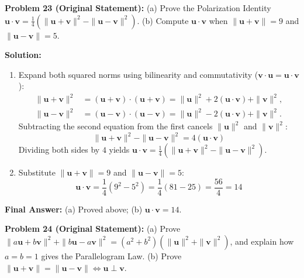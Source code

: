 \documentclass[11pt, letterpaper]{article}
\theoremstyle{definition}
\theoremstyle{remark}
\begin{document}
\textbf{Problem 23 (Original Statement):} (a) Prove the Polarization Identity $\mathbf{u} \cdot \mathbf{v} = \frac{1}{4}\left(\|\mathbf{u} + \mathbf{v}\|^2 - \|\mathbf{u} - \mathbf{v}\|^2\right)$. (b) Compute $\mathbf{u} \cdot \mathbf{v}$ when $\|\mathbf{u} + \mathbf{v}\| = 9$ and $\|\mathbf{u} - \mathbf{v}\| = 5$.

\textbf{Solution:}
\begin{enumerate}[label=(\alph*)]
    \item Expand both squared norms using bilinearity and commutativity ($\mathbf{v} \cdot \mathbf{u} = \mathbf{u} \cdot \mathbf{v}$):
    \begin{align*}
    \|\mathbf{u} + \mathbf{v}\|^2 &= (\mathbf{u} + \mathbf{v}) \cdot (\mathbf{u} + \mathbf{v}) = \|\mathbf{u}\|^2 + 2(\mathbf{u} \cdot \mathbf{v}) + \|\mathbf{v}\|^2, \\
    \|\mathbf{u} - \mathbf{v}\|^2 &= (\mathbf{u} - \mathbf{v}) \cdot (\mathbf{u} - \mathbf{v}) = \|\mathbf{u}\|^2 - 2(\mathbf{u} \cdot \mathbf{v}) + \|\mathbf{v}\|^2.
    \end{align*}
    Subtracting the second equation from the first cancels $\|\mathbf{u}\|^2$ and $\|\mathbf{v}\|^2$:
    \[
    \|\mathbf{u} + \mathbf{v}\|^2 - \|\mathbf{u} - \mathbf{v}\|^2 = 4(\mathbf{u} \cdot \mathbf{v})
    \]
    Dividing both sides by $4$ yields $\mathbf{u} \cdot \mathbf{v} = \frac{1}{4}\left(\|\mathbf{u} + \mathbf{v}\|^2 - \|\mathbf{u} - \mathbf{v}\|^2\right)$.
    \item Substitute $\|\mathbf{u} + \mathbf{v}\| = 9$ and $\|\mathbf{u} - \mathbf{v}\| = 5$:
    \[
    \mathbf{u} \cdot \mathbf{v} = \frac{1}{4}\left(9^2 - 5^2\right) = \frac{1}{4}(81 - 25) = \frac{56}{4} = 14
    \]
\end{enumerate}
\textbf{Final Answer:} (a) Proved above; (b) $\mathbf{u} \cdot \mathbf{v} = 14$.

\medskip
\textbf{Problem 24 (Original Statement):} (a) Prove $\|a\mathbf{u} + b\mathbf{v}\|^2 + \|b\mathbf{u} - a\mathbf{v}\|^2 = (a^2 + b^2)(\|\mathbf{u}\|^2 + \|\mathbf{v}\|^2)$, and explain how $a=b=1$ gives the Parallelogram Law. (b) Prove $\|\mathbf{u} + \mathbf{v}\| = \|\mathbf{u} - \mathbf{v}\| \iff \mathbf{u} \perp \mathbf{v}$.
\end{document}
